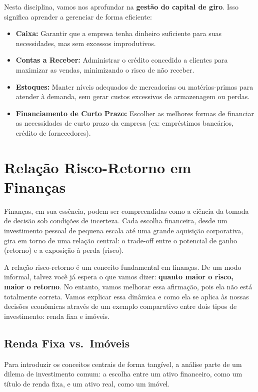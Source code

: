 \documentclass[
  a4paper,
]{book}
\begin{document}
Nesta disciplina, vamos nos aprofundar na \textbf{gestão do capital de
giro}. Isso significa aprender a gerenciar de forma eficiente:

\begin{itemize}
\item
  \textbf{Caixa:} Garantir que a empresa tenha dinheiro suficiente para
  suas necessidades, mas sem excessos improdutivos.
\item
  \textbf{Contas a Receber:} Administrar o crédito concedido a clientes
  para maximizar as vendas, minimizando o risco de não receber.
\item
  \textbf{Estoques:} Manter níveis adequados de mercadorias ou
  matérias-primas para atender à demanda, sem gerar custos excessivos de
  armazenagem ou perdas.
\item
  \textbf{Financiamento de Curto Prazo:} Escolher as melhores formas de
  financiar as necessidades de curto prazo da empresa (ex: empréstimos
  bancários, crédito de fornecedores).
\end{itemize}

\section{Relação Risco-Retorno em
Finanças}\label{relauxe7uxe3o-risco-retorno-em-finanuxe7as}

Finanças, em sua essência, podem ser compreendidas como a ciência da
tomada de decisão sob condições de incerteza. Cada escolha financeira,
desde um investimento pessoal de pequena escala até uma grande aquisição
corporativa, gira em torno de uma relação central: o trade-off entre o
potencial de ganho (retorno) e a exposição à perda (risco).

A relação risco-retorno é um conceito fundamental em finanças. De um
modo informal, talvez você já espera o que vamos dizer: \textbf{quanto
maior o risco, maior o retorno}. No entanto, vamos melhorar essa
afirmação, pois ela não está totalmente correta. Vamos explicar essa
dinâmica e como ela se aplica às nossas decisões econômicas através de
um exemplo comparativo entre dois tipos de investimento: renda fixa e
imóveis.

\subsection{Renda Fixa vs.~Imóveis}\label{renda-fixa-vs.-imuxf3veis}

Para introduzir os conceitos centrais de forma tangível, a análise parte
de um dilema de investimento comum: a escolha entre um ativo financeiro,
como um título de renda fixa, e um ativo real, como um imóvel.
\end{document}
